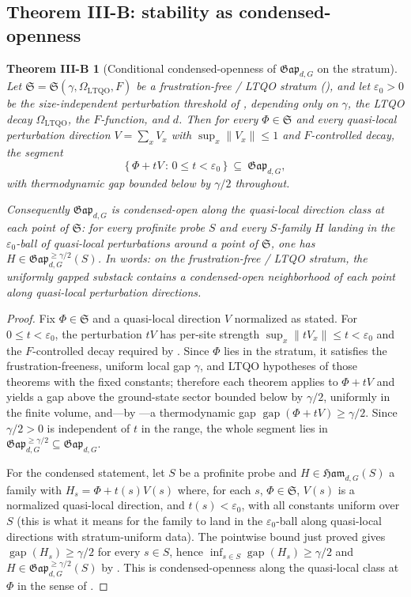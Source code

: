 \documentclass[12pt]{article}
\newcommand{\Ffun}{F}                          %
\newcommand{\Ham}{\mathfrak{Ham}}              %
\newcommand{\Gap}{\mathfrak{Gap}}              %
\newcommand{\gapof}[1]{\operatorname{gap}(#1)} %
\newcommand{\norm}[1]{\lVert #1 \rVert}
\newcommand{\set}[1]{\{\,#1\,\}}
\DeclareMathOperator*{\einf}{inf}
\theoremstyle{plain}
\newtheorem*{thmB}{Theorem III-B}
\theoremstyle{definition}
\theoremstyle{remark}
\begin{document}
\subsection{Theorem III-B: stability as condensed-openness}
\label{sec:stability-thmB}

\begin{thmB}[Conditional condensed-openness of $\Gap_{d,G}$ on the stratum]
\label{thm:IIIB}
Let $\mathfrak{S}=\mathfrak{S}(\gamma,\Omega_{\mathrm{LTQO}},\Ffun)$ be a
frustration-free / LTQO stratum (), and let $\varepsilon_0>0$ be the
size-independent perturbation threshold of , depending
only on $\gamma$, the LTQO decay $\Omega_{\mathrm{LTQO}}$, the $\Ffun$-function, and
$d$. Then for every
$\Phi\in\mathfrak{S}$ and every quasi-local perturbation direction
$V=\sum_x V_x$ with $\sup_x\norm{V_x}\le 1$ and $\Ffun$-controlled decay, the segment
\[
\set{\Phi+tV\,:\,0\le t<\varepsilon_0}\ \subseteq\ \Gap_{d,G},
\]
with thermodynamic gap bounded below by $\gamma/2$ throughout.\par\noindent
Consequently $\Gap_{d,G}$ is condensed-open along the quasi-local direction class at
each point of
$\mathfrak{S}$: for every profinite probe $S$ and every $S$-family $H$ landing in the
$\varepsilon_0$-ball of quasi-local perturbations around a point of
$\mathfrak{S}$, one has $H\in\Gap_{d,G}^{\ge\gamma/2}(S)$. In words: on the
frustration-free / LTQO stratum, the uniformly gapped substack contains a
condensed-open neighborhood of each point along quasi-local perturbation directions.
\end{thmB}

\begin{proof}
Fix $\Phi\in\mathfrak{S}$ and a quasi-local direction $V$ normalized as stated. For
$0\le t<\varepsilon_0$, the perturbation $tV$ has per-site strength
$\sup_x\norm{tV_x}\le t<\varepsilon_0$ and the $\Ffun$-controlled decay required by
. Since $\Phi$ lies in the stratum, it satisfies the
frustration-freeness, uniform local gap $\gamma$, and LTQO hypotheses of those
theorems with the fixed constants; therefore each theorem applies to $\Phi+tV$ and
yields a gap above the ground-state sector bounded below by $\gamma/2$, uniformly in
the finite volume, and---by ---a thermodynamic gap
$\gapof{\Phi+tV}\ge\gamma/2$. Since $\gamma/2>0$ is independent of $t$ in the range,
the whole segment lies in $\Gap_{d,G}^{\ge\gamma/2}\subseteq\Gap_{d,G}$.

For the condensed statement, let $S$ be a profinite probe and $H\in\Ham_{d,G}(S)$ a
family with $H_s=\Phi+t(s)V(s)$ where, for each $s$, $\Phi\in\mathfrak{S}$, $V(s)$ is a
normalized quasi-local direction, and $t(s)<\varepsilon_0$, with all constants uniform
over $S$ (this is what it means for the family to land in the $\varepsilon_0$-ball
along quasi-local directions with stratum-uniform data). The pointwise bound just
proved gives $\gapof{H_s}\ge\gamma/2$ for every $s\in S$, hence
$\einf_{s\in S}\gapof{H_s}\ge\gamma/2$ and $H\in\Gap_{d,G}^{\ge\gamma/2}(S)$ by
. This is condensed-openness along the quasi-local class at $\Phi$ in
the sense of .
\end{proof}
\end{document}
